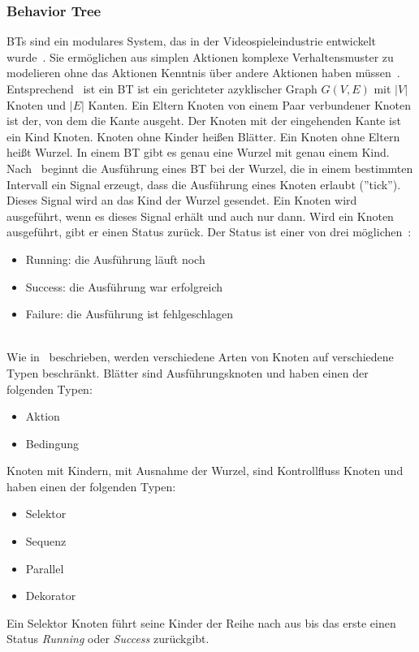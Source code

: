\subsubsection{Behavior Tree}
\acp{BT} sind ein modulares System, das in der Videospieleindustrie entwickelt wurde~\cite{bt_book}.
Sie ermöglichen aus simplen Aktionen komplexe Verhaltensmuster zu modelieren ohne das Aktionen Kenntnis über andere Aktionen haben müssen~\cite{bt_robotics}.
Entsprechend~\cite{bt_1} ist ein \ac{BT} ist ein gerichteter azyklischer Graph $G(V,E)$ mit $|V|$ Knoten und $|E|$ Kanten.
Ein Eltern Knoten von einem Paar verbundener Knoten ist der, von dem die Kante ausgeht.
Der Knoten mit der eingehenden Kante ist ein Kind Knoten.
Knoten ohne Kinder heißen Blätter.
Ein Knoten ohne Eltern heißt Wurzel.
In einem \ac{BT} gibt es genau eine Wurzel mit genau einem Kind.\\
Nach~\cite{bt_book} beginnt die Ausführung eines \ac{BT} bei der Wurzel, die in einem bestimmten Intervall ein Signal erzeugt, dass die Ausführung eines Knoten erlaubt (''tick'').
Dieses Signal wird an das Kind der Wurzel gesendet.
Ein Knoten wird ausgeführt, wenn es dieses Signal erhält und auch nur dann.
Wird ein Knoten ausgeführt, gibt er einen Status zurück.
Der Status ist einer von drei möglichen~\cite{bt_uav}:
\begin{itemize}
    \item Running: die Ausführung läuft noch
    \item Success: die Ausführung war erfolgreich
    \item Failure: die Ausführung ist fehlgeschlagen
\end{itemize}\\
Wie in~\cite{bt_1} beschrieben, werden verschiedene Arten von Knoten auf verschiedene Typen beschränkt.
Blätter sind Ausführungsknoten und haben einen der folgenden Typen:
\begin{itemize}
    \item Aktion
    \item Bedingung
\end{itemize}
Knoten mit Kindern, mit Ausnahme der Wurzel, sind Kontrollfluss Knoten und haben einen der folgenden Typen:
\begin{itemize}
    \item Selektor
    \item Sequenz
    \item Parallel
    \item Dekorator
\end{itemize}
Ein Selektor Knoten führt seine Kinder der Reihe nach aus bis das erste einen Status \emph{Running} oder \emph{Success} zurückgibt.
